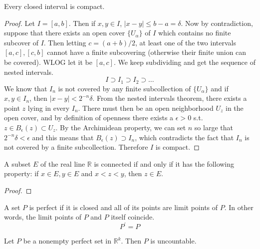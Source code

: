   \begin{corollary}
    Every closed interval is compact. 
  \end{corollary}
  \begin{proof}
    Let $I = [a, b]$. Then if $x, y \in I$, $|x - y| \leq b - a = \delta$. Now by contradiction, suppose that there exists an open cover $\{U_\alpha\}$ of $I$ which contains no finite subcover of $I$. Then letting $c = (a + b)/2$, at least one of the two intervals $[a, c], [c, b]$ cannot have a finite subcovering (otherwise their finite union can be covered). WLOG let it be $[a, c]$. We keep subdividing and get the sequence of nested intervals. 
    \begin{equation}
      I \supset I_1 \supset I_2 \supset \ldots 
    \end{equation}
    We know that $I_n$ is not covered by any finite subcollection of $\{U_\alpha\}$ and if $x, y \in I_n$, then $|x - y| < 2^{-n} \delta$. From the nested intervals theorem, there exists a point $z$ lying in every $I_n$. There must then be an open neighborhood $U_z$ in the open cover, and by definition of openness there exists a $\epsilon > 0$ s.t. $z \in B_\epsilon (z) \subset U_z$. By the Archimidean property, we can set $n$ so large that $2^{-n} \delta < \epsilon$ and this means that $B_\epsilon (z) \supset I_n$, which contradicts the fact that $I_n$ is not covered by a finite subcollection. Therefore $I$ is compact. 
  \end{proof}

  \begin{theorem}[Connectedness]
    A subset $E$ of the real line $\mathbb{R}$ is connected if and only if it has the following property: if $x \in E, y \in E$ and $x < z < y$, then $z \in E$. 
  \end{theorem}
  \begin{proof}

  \end{proof}

  \begin{definition}
    A set $P$ is perfect if it is closed and all of its points are limit points of $P$. In other words, the limit points of $P$ and $P$ itself coincide. 
    \begin{equation}
      P^\prime = P
    \end{equation}
  \end{definition}

  \begin{theorem}
    Let $P$ be a nonempty perfect set in $\mathbb{R}^k$. Then $P$ is uncountable. 
  \end{theorem}


